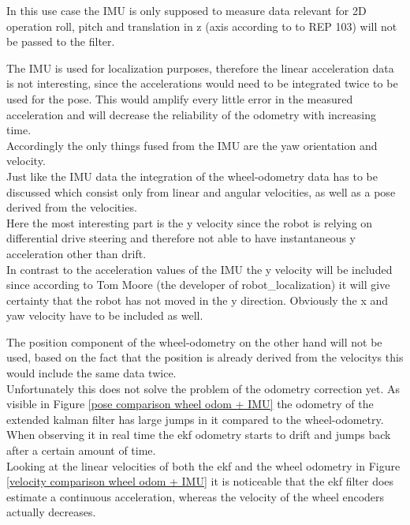 In this use case the IMU is only supposed to measure data relevant for 2D operation roll, pitch and translation in z (axis according to to REP 103) will not be passed to the filter. 

The IMU is used for localization purposes, therefore the linear acceleration data is not interesting, since the accelerations would need to be integrated twice to be used for the pose. This would amplify every little error in the measured acceleration and will decrease the reliability of the odometry with increasing time.\\

Accordingly the only things fused from the IMU are the yaw orientation and velocity.\\

Just like the IMU data the integration of the wheel-odometry data has to be discussed which consist only from linear and angular velocities, as well as a pose derived from the velocities.\\

Here the most interesting part is the y velocity since the robot is relying on differential drive steering and therefore not able to have instantaneous y acceleration other than drift.\\

In contrast to the acceleration values of the IMU the y velocity will be included since according to Tom Moore (the developer of robot\_localization) it will give certainty that the robot has not moved in the y direction\cite{robotlocalizationconfiguration}. Obviously the x and yaw velocity have to be included as well.

The position component of the wheel-odometry on the other hand will not be used, based on the fact that the position is already derived from the velocitys this would include the same data twice.\\

Unfortunately this does not solve the problem of the odometry correction yet. As visible in Figure \ref{pose comparison wheel odom + IMU} the odometry of the extended kalman filter has large jumps in it compared to the wheel-odometry. When observing it in real time the ekf odometry starts to drift and jumps back after a certain amount of time.\\
Looking at the linear velocities of both the ekf and the wheel odometry in Figure \ref{velocity comparison wheel odom + IMU} it is noticeable that the ekf filter does estimate a continuous acceleration, whereas the velocity of the wheel encoders actually decreases.\\



